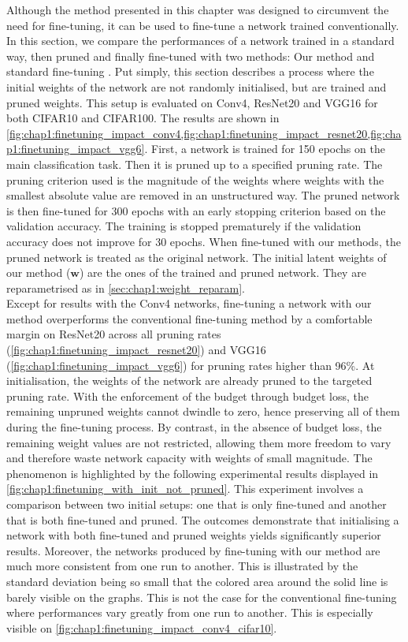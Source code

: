 Although the method presented in this chapter was designed to circumvent the
need for fine-tuning, it can be used to fine-tune a network trained
conventionally. In this section, we compare the performances of a network
trained in a standard way, then pruned and finally fine-tuned with two methods:
Our method and standard fine-tuning \cite{DBLP:conf/nips/HanPTD15}. Put simply,
this section describes a process where the initial weights of the network are
not randomly initialised, but are trained and pruned weights. This setup is
evaluated on Conv4, ResNet20 and VGG16 for both CIFAR10 and CIFAR100. The
results are shown in
\cref{fig:chap1:finetuning_impact_conv4,fig:chap1:finetuning_impact_resnet20,fig:chap1:finetuning_impact_vgg6}.
First, a network is trained for 150 epochs on the main classification task. Then
it is pruned up to a specified pruning rate. The pruning criterion used is the
magnitude of the weights where weights with the smallest absolute value are
removed in an unstructured way. The pruned network is then fine-tuned for 300
epochs with an early stopping criterion based on the validation accuracy. The
training is stopped prematurely if the validation accuracy does not improve for
30 epochs. When fine-tuned with our methods, the pruned network is treated as
the original network. The initial latent weights of our method ($\mathbf{w}$)
are the ones of the trained and pruned network. They are reparametrised as in
\ref{sec:chap1:weight_reparam}.\\

Except for results with the Conv4 networks, fine-tuning a network with our
method overperforms the conventional fine-tuning method by a comfortable margin
on ResNet20 across all pruning rates
(\cref{fig:chap1:finetuning_impact_resnet20}) and VGG16
(\cref{fig:chap1:finetuning_impact_vgg6}) for pruning rates higher than 96\%. At
initialisation, the weights of the network are already pruned to the targeted
pruning rate. With the enforcement of the budget through budget loss, the
remaining unpruned weights cannot dwindle to zero, hence preserving all of them
during the fine-tuning process. By contrast, in the absence of budget loss, the
remaining weight values are not restricted, allowing them more freedom to vary
and therefore waste network capacity with weights of small magnitude. The
phenomenon is highlighted by the following experimental results displayed in
\cref{fig:chap1:finetuning_with_init_not_pruned}. This experiment involves a
comparison between two initial setups: one that is only fine-tuned and another
that is both fine-tuned and pruned. The outcomes demonstrate that initialising a
network with both fine-tuned and pruned weights yields significantly superior
results. Moreover, the networks produced by fine-tuning with our method are much
more consistent from one run to another. This is illustrated by the standard
deviation being so small that the colored area around the solid line is barely
visible on the graphs. This is not the case for the conventional fine-tuning
where performances vary greatly from one run to another. This is especially
visible on \cref{fig:chap1:finetuning_impact_conv4_cifar10}.\\

